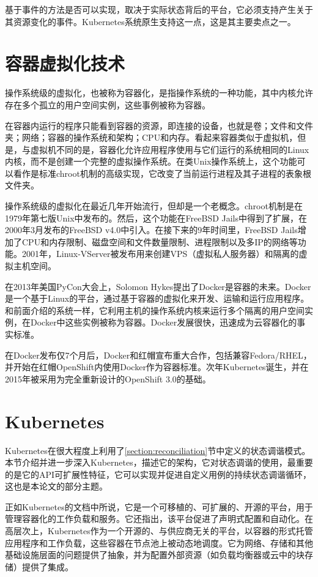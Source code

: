 \documentclass[macfonts,master]{njuthesis}
\begin{document}
基于事件的方法是否可以实现，取决于实际状态背后的平台，它必须支持产生关于其资源变化的事件。Kubernetes系统原生支持这一点，这是其主要卖点之一。


\section{容器虚拟化技术}
操作系统级的虚拟化，也被称为容器化，是指操作系统的一种功能，其中内核允许存在多个孤立的用户空间实例，这些事例被称为容器。

在容器内运行的程序只能看到容器的资源，即连接的设备，也就是卷；文件和文件夹；网络；容器的操作系统和架构；CPU和内存。看起来容器类似于虚拟机，但是，与虚拟机不同的是，容器化允许应用程序使用与它们运行的系统相同的Linux内核，而不是创建一个完整的虚拟操作系统。在类Unix操作系统上，这个功能可以看作是标准chroot机制的高级实现，它改变了当前运行进程及其子进程的表象根文件夹。

操作系统级的虚拟化在最近几年开始流行，但却是一个老概念。chroot机制是在1979年第七版Unix中发布的。然后，这个功能在FreeBSD Jails中得到了扩展，在2000年3月发布的FreeBSD v4.0中引入。在接下来的9年时间里，FreeBSD Jails增加了CPU和内存限制、磁盘空间和文件数量限制、进程限制以及多IP的网络等功能。2001年，Linux-VServer被发布用来创建VPS（虚拟私人服务器）和隔离的虚拟主机空间。

在2013年美国PyCon大会上，Solomon Hykes提出了Docker是容器的未来。Docker是一个基于Linux的平台，通过基于容器的虚拟化来开发、运输和运行应用程序。和前面介绍的系统一样，它利用主机的操作系统内核来运行多个隔离的用户空间实例，在Docker中这些实例被称为容器。Docker发展很快，迅速成为云容器化的事实标准\cite{cloudcontainertech}。

在Docker发布仅7个月后，Docker和红帽宣布重大合作，包括兼容Fedora/RHEL，并开始在红帽OpenShift内使用Docker作为容器标准\cite{dockerredhat}。次年Kubernetes诞生，并在2015年被采用为完全重新设计的OpenShift 3.0的基础\cite{openshiftk8s}。

\section{Kubernetes}

Kubernetes在很大程度上利用了\ref{section:reconciliation}节中定义的状态调谐模式。本节介绍并进一步深入Kubernetes，描述它的架构，它对状态调谐的使用，最重要的是它的API可扩展性特征，它可以实现并促进自定义用例的持续状态调谐循环，这也是本论文的部分主题。

正如Kubernetes的文档中所说，它是一个可移植的、可扩展的、开源的平台，用于管理容器化的工作负载和服务。它还指出，该平台促进了声明式配置和自动化\cite{whatisk8s}。在高层次上，Kubernetes作为一个开源的、与供应商无关的平台，以容器的形式托管应用程序和工作负载，这些容器在节点池上被动态地调度。它为网络、存储和其他基础设施层面的问题提供了抽象，并为配置外部资源（如负载均衡器或云中的块存储）提供了集成。
\end{document}
